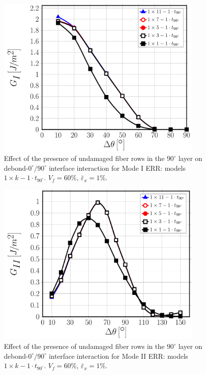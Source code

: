 \begin{figure}[!htb]
\centering
\includegraphics[width=0.9\textwidth]{paperC/1xk-1-vf60-GI.pdf}
\caption{Effect of the presence of undamaged fiber rows in the $90^{\circ}$ layer on debond-$0^{\circ}/90^{\circ}$ interface interaction for Mode I ERR: models $1\times k-1\cdot t_{90^{\circ}}$. $V_{f}=60\%$, $\bar{\varepsilon}_{x}=1\%$.}\label{chap3:paperC:fig:1kGI}
\end{figure}

\begin{figure}[!htb]
\centering
\includegraphics[width=0.9\textwidth]{paperC/1xk-1-vf60-GII.pdf}
\caption{Effect of the presence of undamaged fiber rows in the $90^{\circ}$ layer on debond-$0^{\circ}/90^{\circ}$ interface interaction for Mode II ERR: models $1\times k-1\cdot t_{90^{\circ}}$. $V_{f}=60\%$, $\bar{\varepsilon}_{x}=1\%$.}\label{chap3:paperC:fig:1kGII}
\end{figure}

